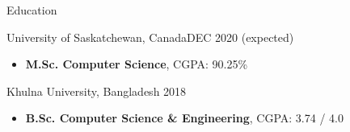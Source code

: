 \documentclass[]{mcdowellcv}
\begin{document}
	\makeheader
	
	
	
	\begin{cvsection}{Education}
		\begin{cvsubsection}{}{University of Saskatchewan, Canada}{DEC 2020 (expected)}
			\begin{itemize}
				\item \textbf{M.Sc. Computer Science}, CGPA: 90.25\%
				
			\end{itemize}
		\end{cvsubsection}
		\begin{cvsubsection}{}{Khulna University, Bangladesh}{ 2018}
			\begin{itemize}
				\item \textbf{B.Sc. Computer Science \& Engineering}, CGPA: 3.74 / 4.0
				
			\end{itemize}
		\end{cvsubsection}
	\end{cvsection}
	
\end{document}
